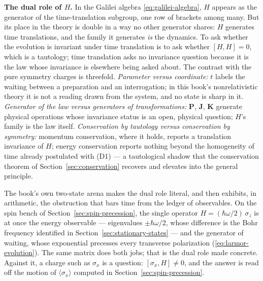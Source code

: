 \textbf{The dual role of $H$.} In the Galilei algebra \eqref{eq:galilei-algebra}, $H$ appears as the generator of the time-translation subgroup, one row of brackets among many. But its place in the theory is double in a way no other generator shares: $H$ generates time translations, and the family it generates \emph{is} the dynamics. To ask whether the evolution is invariant under time translation is to ask whether $[H,H] = 0$, which is a tautology; time translation asks no invariance question because it is the law whose invariance is elsewhere being asked about. The contrast with the pure symmetry charges is threefold. \emph{Parameter versus coordinate:} $t$ labels the waiting between a preparation and an interrogation; in this book's nonrelativistic theory it is not a reading drawn from the system, and no state is sharp in it. \emph{Generator of the law versus generators of transformations:} $\bm P$, $\bm J$, $\bm K$ generate physical operations whose invariance status is an open, physical question; $H$'s family is the law itself. \emph{Conservation by tautology versus conservation by symmetry:} momentum conservation, where it holds, reports a translation invariance of $H$; energy conservation reports nothing beyond the homogeneity of time already postulated with (D1) --- a tautological shadow that the conservation theorem of Section~\ref{sec:conservation} recovers and elevates into the general principle.

The book's own two-state arena makes the dual role literal, and then exhibits, in arithmetic, the obstruction that bars time from the ledger of observables. On the spin bench of Section~\ref{sec:spin-precession}, the single operator $H = (\hbar\omega/2)\,\sigma_z$ is at once the energy observable --- eigenvalues $\pm\hbar\omega/2$, whose difference is the Bohr frequency identified in Section~\ref{sec:stationary-states} --- and the generator of waiting, whose exponential precesses every transverse polarization (\eqref{eq:larmor-evolution}). The same matrix does both jobs; that is the dual role made concrete. Against it, a charge such as $\sigma_x$ is a question: $[\sigma_x,H] \neq 0$, and the answer is read off the motion of $\langle\sigma_x\rangle$ computed in Section~\ref{sec:spin-precession}.

